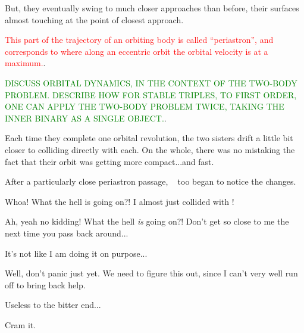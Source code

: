 \documentclass[main.tex]{subfiles}
\begin{document}
\par \nar But, they eventually swing to much closer approaches than before, their surfaces almost touching at the point of closest approach.

\begin{tcolorbox}[sharp corners, colback=red!30, colframe=red!80!blue, title=Periastron]
\par \textcolor{red}{This part of the trajectory of an orbiting body is called ``periastron'', and corresponds to where along an eccentric orbit the orbital velocity is at a maximum.}.  
\end{tcolorbox}

\begin{tcolorbox}[sharp corners, colback=green!30, colframe=green!80!blue, title=Orbital Dynamics]
\par \textcolor{green}{DISCUSS ORBITAL DYNAMICS, IN THE CONTEXT OF THE TWO-BODY PROBLEM.  DESCRIBE HOW FOR STABLE TRIPLES, TO FIRST ORDER, ONE CAN APPLY THE TWO-BODY PROBLEM TWICE, TAKING THE INNER BINARY AS A SINGLE OBJECT.}.  
\end{tcolorbox}

\par \nar Each time they complete one orbital revolution, the two sisters drift a little bit closer to colliding directly with each.  On the whole, there was no mistaking the fact that their orbit was getting more compact...and fast.

\par \nar After a particularly close periastron passage, \rmtaygete~ too began to notice the changes.

\par \Taygete  Whoa!  What the hell is going on?!  I almost just collided with \rmalcyone!

\par \Alcyone Ah, yeah no kidding!  What the hell \textit{is} going on?!  Don't get so close to me the next time you pass back around...

\par \Taygete It's not like I am doing it on purpose...

\par \Celaeno  Well, don't panic just yet.  We need to figure this out, since I can't very well run off to bring back help.

\par \Alcyone Useless to the bitter end...

\par \Celaeno Cram it.  
\end{document}
